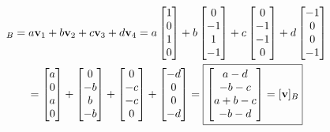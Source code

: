 \documentclass[]{article}
\newcommand{\bmat}[1]{\begin{bmatrix}#1\end{bmatrix}}
\begin{document}
\section{}
\begin{multline*} [\vb{v}]_B = a\vb{v}_1 + b\vb{v}_2 + c\vb{v}_3 + d\vb{v}_4 = a\bmat{1\\0\\1\\0} + b\bmat{0\\-1\\1\\-1} + c\bmat{0\\-1\\-1\\0} + d\bmat{-1\\0\\0\\-1}\\
	= \bmat{a\\0\\a\\0}+\bmat{0\\-b\\b\\-b}+\bmat{0\\-c\\-c\\0}+\bmat{-d\\0\\0\\-d} = \boxed{\bmat{a-d\\-b-c\\a+b-c\\-b-d} = [\vb{v}]_B}
\end{multline*}
\end{document}
